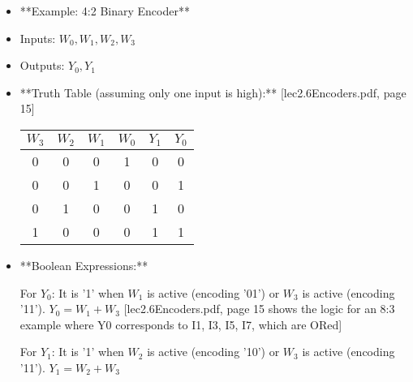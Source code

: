 \documentclass{article}
\begin{document}
\begin{itemize}
(b) Designing Encoders

Designing encoders involves translating their specified functionality (whether basic or priority) into a combinational logic circuit using fundamental gates (AND, OR, NOT). This process typically begins with a truth table, from which Boolean expressions are derived, and then implemented using logic gates.

\begin{enumerate}
\item Implementing a Basic Binary Encoder

\end{enumerate}
A basic binary encoder, such as a $2^n$-to-$n$ encoder, assumes that only one input line is active at any given time [lec2.6Encoders.pdf]. The design involves directly ORing the inputs that should contribute to a '1' for each output bit.

\item **Example: 4:2 Binary Encoder**

    \item Inputs: $W_0, W_1, W_2, W_3$

    \item Outputs: $Y_0, Y_1$

    \item **Truth Table (assuming only one input is high):** [lec2.6Encoders.pdf, page 15] \begin{tabular}{|cccc|cc|} \\ \hline
 $W_3$ & $W_2$ & $W_1$ & $W_0$ & $Y_1$ & $Y_0$ \\ \hline

 0 & 0 & 0 & 1 & 0 & 0 \\ 0 & 0 & 1 & 0 & 0 & 1 \\ 0 & 1 & 0 & 0 & 1 & 0 \\ 1 & 0 & 0 & 0 & 1 & 1 \\ \hline

\end{tabular}



    \item **Boolean Expressions:**

         For $Y_0$: It is '1' when $W_1$ is active (encoding '01') or $W_3$ is active (encoding '11'). $Y_0 = W_1 + W_3$ [lec2.6Encoders.pdf, page 15 shows the logic for an 8:3 example where Y0 corresponds to I1, I3, I5, I7, which are ORed]

         For $Y_1$: It is '1' when $W_2$ is active (encoding '10') or $W_3$ is active (encoding '11'). $Y_1 = W_2 + W_3$


\end{itemize}
\end{document}
